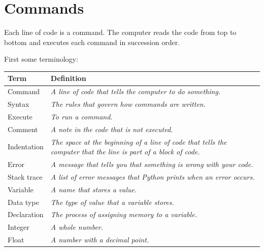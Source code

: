 \documentclass[
  letterpaper,
  DIV=11,
  numbers=noendperiod]{scrreprt}
\begin{document}

\section*{Commands}\label{commands}


Each line of code is a command. The computer reads the code from top to
bottom and executes each command in succession order.

First some terminology:

\begin{longtable}[]{@{}
  >{\raggedright\arraybackslash}p{}
  >{\raggedright\arraybackslash}p{}@{}}
\toprule\noalign{}
\begin{minipage}[b]{\linewidth}\raggedright
Term
\end{minipage} & \begin{minipage}[b]{\linewidth}\raggedright
Definition
\end{minipage} \\
\midrule\noalign{}
\endhead
\bottomrule\noalign{}
\endlastfoot
Command & \emph{A line of code that tells the computer to do
something.} \\
Syntax & \emph{The rules that govern how commands are written.} \\
Execute & \emph{To run a command.} \\
Comment & \emph{A note in the code that is not executed.} \\
Indentation & \emph{The space at the beginning of a line of code that
tells the computer that the line is part of a block of code.} \\
Error & \emph{A message that tells you that something is wrong with your
code.} \\
Stack trace & \emph{A list of error messages that Python prints when an
error occurs.} \\
Variable & \emph{A name that stores a value.} \\
Data type & \emph{The type of value that a variable stores.} \\
Declaration & \emph{The process of assigning memory to a variable.} \\
Integer & \emph{A whole number.} \\
Float & \emph{A number with a decimal point.} \\

\end{longtable}
\end{document}
